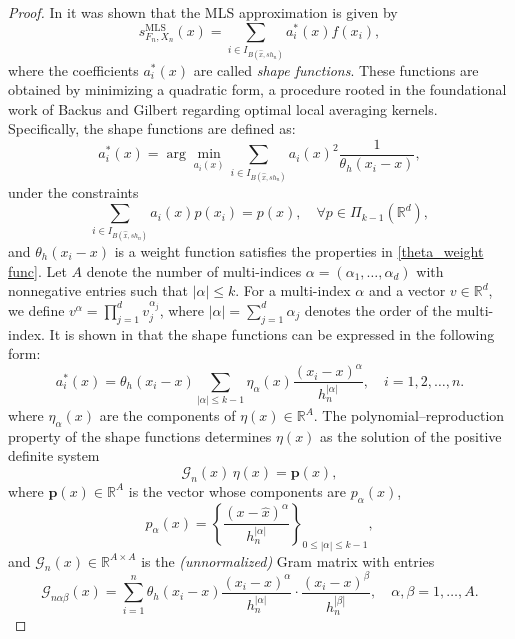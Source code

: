 \documentclass{article}
\newcommand{\mlsfunstoch}{s^\text{MLS}_{F_n,X_n}}
\begin{document}
\begin{proof}
In \cite{levin1998approximation} it was shown that the MLS approximation is given by
$$
\mlsfunstoch(x)=\sum_{i \in I_{B\left(\hat{x}, s h_n\right)}} a_i^*(x) f\left(x_i\right),
$$
where the coefficients $a_i^*(x)$ are called \textit{shape functions}. These functions are obtained by minimizing a quadratic form, a procedure rooted in the foundational work of Backus and Gilbert \cite{backus1968resolving, backus1970uniqueness} regarding optimal local averaging kernels. Specifically, the shape functions are defined as:
$$
a_i^*(x)=\arg\min_{a_i(x)}\sum_{i \in I_{B\left(\hat{x}, s h_n\right)}} a_i(x)^2 \frac{1}{\theta_h\left(x_i-x\right)},
$$
under the constraints
$$
\sum_{i \in I_{B\left(\hat{x}, s h_n\right)}} a_i(x) p\left(x_i\right)=p(x), \quad \forall p \in \Pi_{k-1}\left(\mathbb{R}^d\right),
$$
and $\theta_h(x_i-x)$ is a weight function satisfies the properties in \eqref{theta_weight func}.
Let $A$ denote the number of multi-indices $\alpha = (\alpha_1, \dots, \alpha_d)$ with nonnegative entries such that $|\alpha|\leq k$. For a multi-index $\alpha$ and a vector $v \in \mathbb{R}^d$, we define $v^\alpha = \prod_{j=1}^d v_j^{\alpha_j}$, where $|\alpha| = \sum_{j=1}^d \alpha_j$ denotes the order of the multi-index.
It is shown in \cite{mirzaei2015analysis} that the shape functions can be expressed  in the following form:
\begin{equation}
    a_i^*(x)=\theta_h(x_i-x) \sum_{|\alpha| \leq k-1} \eta_\alpha(x) \frac{\left( x_i-x\right)^\alpha}{h_n^{|\alpha|}}, \quad i=1,2, \ldots, n.
    \label{explicitly a*_i}
\end{equation}
where $\eta_\alpha(x)$ are the components of $\eta(x)\in\mathbb{R}^A$. The polynomial--reproduction property of the shape functions determines $\eta(x)$ as the solution of the positive definite system
\begin{equation}
\mathscr{G}_n(x)\,\eta(x)=\boldsymbol{p}(x),
\label{gram system}
\end{equation}
where $\boldsymbol{p}(x)\in \mathbb{R}^A$ is the vector whose components are $p_\alpha(x)$,
\begin{equation}
    p_\alpha(x)=\left\{\frac{(x-\hat{x})^\alpha}{h_n^{|\alpha|}}\right\}_{0 \leq|\alpha| \leq k-1},
    \label{eq:polynomial basis}
\end{equation}
and $\mathscr{G}_n(x)\in \mathbb{R}^{A\times A}$ is the \emph{(unnormalized)} Gram matrix with entries
\begin{equation}
    \mathscr{G}_{n\alpha \beta}(x)=\sum_{i=1}^n \theta_h(x_i - x) \frac{(x_i - x)^\alpha}{h_n^{|\alpha|}} \cdot \frac{(x_i - x)^\beta}{h_n^{|\beta|}}, \quad \alpha, \beta =1, \ldots, A.

\end{equation}
\end{proof}
\end{document}
